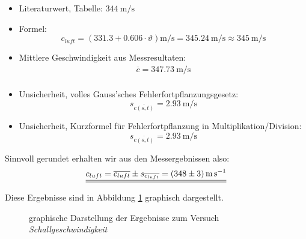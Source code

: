 \begin{itemize}
    \item
        Literaturwert, Tabelle: $\SI{344}{\meter\per\second}$
    \item
        Formel:
        \begin{equation}
            \label{eq:schallgeschwTemperatur2}
            c_{luft} = (331.3 + 0.606 \cdot \vartheta) \si{\meter\per\second}  = \SI{345.24}{\meter\per\second} \approx \SI{345}{\meter\per\second}
        \end{equation}
    \item
        Mittlere Geschwindigkeit aus Messresultaten:
        \begin{gather*}
            \overline{c} = \SI{347.73}{\meter\per\second} \\
        \end{gather*}
    \item
        Unsicherheit, volles Gauss'sches Fehlerfortpflanzungsgesetz:
        \begin{equation*}
            s_{\overline{c(s,t)}} = \SI{2.93}{\meter\per\second}
        \end{equation*}
    \item
        Unsicherheit, Kurzformel f\"ur Fehlerfortpflanzung in Multiplikation/Division:
        \begin{equation*}
            s_{\overline{c(s,t)}} = \SI{2.93}{\meter\per\second}
        \end{equation*}
\end{itemize}

Sinnvoll gerundet erhalten wir aus den Messergebnissen also:
\begin{equation}
    \underline{\underline{c_{luft} = \overline{c_{luft}} \pm s_{\overline{c_{luft}}} = \SI[separate-uncertainty = true]{348 \pm 3}{\meter\per\second}}}
\end{equation}

Diese  Ergebnisse  sind in  Abbildung  \ref{fig:schallgeschwindigkeit:results}
graphisch dargestellt.

\begin{figure}[ht!]
\centering
{}
\caption{graphische Darstellung der Ergebnisse zum Versuch \emph{Schallgeschwindigkeit}}
\label{fig:schallgeschwindigkeit:results}
\end{figure}

